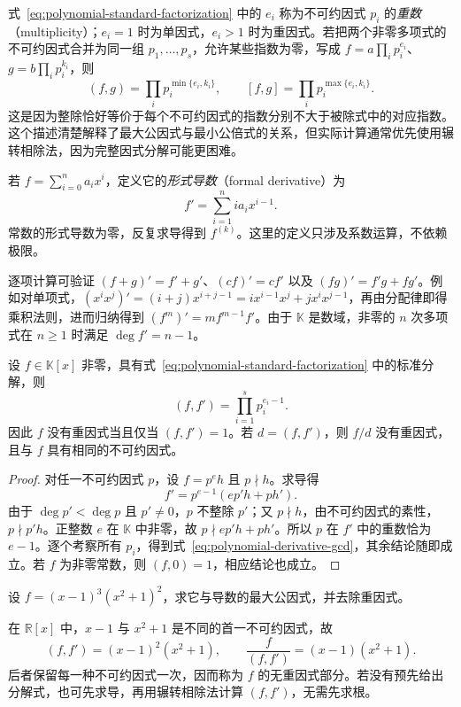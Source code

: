 式~\eqref{eq:polynomial-standard-factorization} 中的 $e_i$ 称为不可约因式 $p_i$ 的\emph{重数}（multiplicity）；$e_i=1$ 时为单因式，$e_i>1$ 时为重因式。若把两个非零多项式的不可约因式合并为同一组 $p_1,\ldots,p_s$，允许某些指数为零，写成 $f=a\prod_i p_i^{e_i}$、$g=b\prod_i p_i^{k_i}$，则
\[
    (f,g)=\prod_i p_i^{\min\{e_i,k_i\}},\qquad
    [f,g]=\prod_i p_i^{\max\{e_i,k_i\}}.
\]
这是因为整除恰好等价于每个不可约因式的指数分别不大于被除式中的对应指数。这个描述清楚解释了最大公因式与最小公倍式的关系，但实际计算通常优先使用辗转相除法，因为完整因式分解可能更困难。

\begin{definition}
若 $f=\sum_{i=0}^n a_ix^i$，定义它的\emph{形式导数}（formal derivative）为
\[
    f'=\sum_{i=1}^n ia_ix^{i-1}.
\]
常数的形式导数为零，反复求导得到 $f^{(k)}$。这里的定义只涉及系数运算，不依赖极限。
\end{definition}

逐项计算可验证 $(f+g)'=f'+g'$、$(cf)'=cf'$ 以及 $(fg)'=f'g+fg'$。例如对单项式，$(x^ix^j)'=(i+j)x^{i+j-1}=ix^{i-1}x^j+jx^ix^{j-1}$，再由分配律即得乘积法则，进而归纳得到 $(f^m)'=mf^{m-1}f'$。由于 $\mathbb K$ 是数域，非零的 $n$ 次多项式在 $n\geq1$ 时满足 $\deg f'=n-1$。

\begin{theorem}[重因式判别]
\label{thm:polynomial-squarefree}
设 $f\in\mathbb K[x]$ 非零，具有式~\eqref{eq:polynomial-standard-factorization} 中的标准分解，则
\begin{equation}
\label{eq:polynomial-derivative-gcd}
    (f,f')=\prod_{i=1}^s p_i^{e_i-1}.
\end{equation}
因此 $f$ 没有重因式当且仅当 $(f,f')=1$。若 $d=(f,f')$，则 $f/d$ 没有重因式，且与 $f$ 具有相同的不可约因式。
\end{theorem}
\begin{proof}
对任一不可约因式 $p$，设 $f=p^eh$ 且 $p\nmid h$。求导得
\[
    f'=p^{e-1}(ep'h+ph').
\]
由于 $\deg p'<\deg p$ 且 $p'\ne0$，$p$ 不整除 $p'$；又 $p\nmid h$，由不可约因式的素性，$p\nmid p'h$。正整数 $e$ 在 $\mathbb K$ 中非零，故 $p\nmid ep'h+ph'$。所以 $p$ 在 $f'$ 中的重数恰为 $e-1$。逐个考察所有 $p_i$，得到式~\eqref{eq:polynomial-derivative-gcd}，其余结论随即成立。若 $f$ 为非零常数，则 $(f,0)=1$，相应结论也成立。
\end{proof}

\begin{example}
设 $f=(x-1)^3(x^2+1)^2$，求它与导数的最大公因式，并去除重因式。
\end{example}
\begin{solve}
在 $\mathbb R[x]$ 中，$x-1$ 与 $x^2+1$ 是不同的首一不可约因式，故
\[
    (f,f')=(x-1)^2(x^2+1),\qquad
    \frac{f}{(f,f')}=(x-1)(x^2+1).
\]
后者保留每一种不可约因式一次，因而称为 $f$ 的无重因式部分。若没有预先给出分解式，也可先求导，再用辗转相除法计算 $(f,f')$，无需先求根。
\end{solve}

